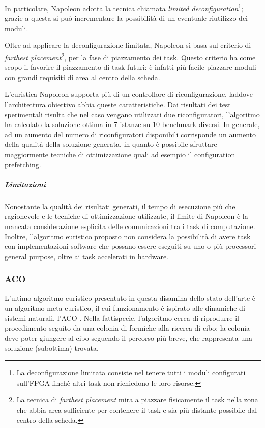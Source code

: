 In particolare, Napoleon adotta la tecnica chiamata \emph{limited 
deconfiguration}\footnote{La deconfigurazione limitata consiste nel tenere 
tutti i moduli configurati sull'\ac{FPGA} finchè altri task non richiedono le 
loro risorse.}; grazie a questa si può incrementare la possibilità di 
un eventuale riutilizzo dei moduli.

Oltre ad applicare la deconfigurazione limitata, Napoleon si basa sul criterio 
di \emph{farthest placement}\footnote{La tecnica di \emph{farthest placement} 
mira a piazzare fisicamente il task nella zona che abbia area sufficiente per 
contenere il task e sia più distante possibile dal centro della scheda.}, per 
la fase di piazzamento dei task. Questo criterio ha come scopo il favorire il 
piazzamento di task futuri: è infatti più facile piazzare moduli con grandi 
requisiti di area al centro della scheda.

L'euristica Napoleon supporta più di un controllore di riconfigurazione, 
laddove l'architettura obiettivo abbia queste caratteristiche. Dai risultati 
dei test sperimentali risulta che nel caso vengano utilizzati due 
riconfiguratori, l'algoritmo ha calcolato la soluzione ottima in $7$ istanze su 
$10$ benchmark diversi. In generale, ad un aumento del numero di 
riconfiguratori disponibili corrisponde un aumento della qualità della 
soluzione generata, in quanto è possibile sfruttare maggiormente tecniche di 
ottimizzazione quali ad esempio il configuration prefetching.

\subparagraph{Limitazioni}
Nonostante la qualità dei risultati generati, il tempo di esecuzione più che 
ragionevole e le tecniche di ottimizzazione utilizzate, il limite di Napoleon è 
la mancata considerazione esplicita delle comunicazioni tra i task di 
computazione. Inoltre, l'algoritmo euristico proposto non considera la 
possibilità di avere task con implementazioni software che possano essere 
eseguiti su uno o più processori general purpose, oltre ai task accelerati in 
hardware.


\subsubsection{\acl{ACO}}
L'ultimo algoritmo euristico presentato in questa disamina dello stato 
dell'arte è un algoritmo meta-euristico, il cui funzionamento è ispirato alle 
dinamiche di sistemi naturali, l'\ac{ACO} \cite{AntSystem}. Nella fattispecie, 
l'algoritmo cerca di riprodurre il procedimento seguito da una colonia di 
formiche alla ricerca di cibo; la colonia deve poter giungere al cibo seguendo 
il percorso più breve, che rappresenta una soluzione (subottima) trovata.

